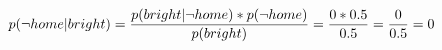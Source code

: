 \documentclass{article}
\begin{document}
\begin{itemize}
\[
p(\neg home|bright) = \frac{p(bright|\neg home)*p(\neg home)}{p(bright)}\\
= \frac{0 * 0.5}{0.5}\\
= \frac{0}{0.5}\\
= 0\\
\]

 
\end{itemize}
\end{document}
